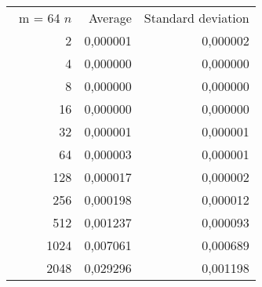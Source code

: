 \begin{tabular}{rrr}\
m = 64
 $n$ & Average & Standard deviation  \\
2 &  0,000001 &  0,000002 \\ 
4 &  0,000000 &  0,000000 \\ 
8 &  0,000000 &  0,000000 \\ 
16 &  0,000000 &  0,000000 \\ 
32 &  0,000001 &  0,000001 \\ 
64 &  0,000003 &  0,000001 \\ 
128 &  0,000017 &  0,000002 \\ 
256 &  0,000198 &  0,000012 \\ 
512 &  0,001237 &  0,000093 \\ 
1024 &  0,007061 &  0,000689 \\ 
2048 &  0,029296 &  0,001198 \\ 
\end{tabular}

